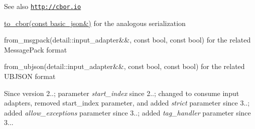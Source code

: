 \begin{DoxySeeAlso}{See also}
\href{http://cbor.io}{\tt http\+://cbor.\+io} 

\hyperlink{classnlohmann_1_1basic__json_adabcf74c9c868da3e04a5546b7705af4}{to\+\_\+cbor(const basic\+\_\+json\&)} for the analogous serialization 

from\+\_\+msgpack(detail\+::input\+\_\+adapter\&\&, const bool, const bool) for the related Message\+Pack format 

from\+\_\+ubjson(detail\+::input\+\_\+adapter\&\&, const bool, const bool) for the related U\+B\+J\+S\+ON format
\end{DoxySeeAlso}
\begin{DoxySince}{Since}
version 2..; parameter {\itshape start\+\_\+index} since 2..; changed to consume input adapters, removed start\+\_\+index parameter, and added {\itshape strict} parameter since 3..; added {\itshape allow\+\_\+exceptions} parameter since 3..; added {\itshape tag\+\_\+handler} parameter since 3... 
\end{DoxySince}
